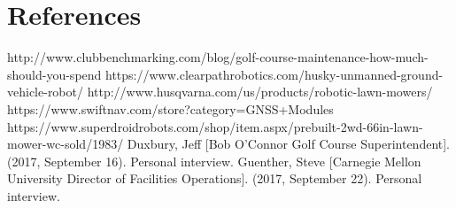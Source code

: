 \documentclass[12pt]{extarticle}
\begin{document}
\section{References}
\renewcommand{\section}[2]{}%
\begin{thebibliography}{}
http://www.clubbenchmarking.com/blog/golf-course-maintenance-how-much-should-you-spend
https://www.clearpathrobotics.com/husky-unmanned-ground-vehicle-robot/
http://www.husqvarna.com/us/products/robotic-lawn-mowers/
https://www.swiftnav.com/store?category=GNSS+Modules
https://www.superdroidrobots.com/shop/item.aspx/prebuilt-2wd-66in-lawn-mower-wc-sold/1983/
Duxbury, Jeff [Bob O’Connor Golf Course Superintendent]. (2017, September 16). Personal interview.
Guenther, Steve [Carnegie Mellon University Director of Facilities Operations]. (2017, September 22). Personal interview.
\end{thebibliography}
\endgroup
\end{document}
